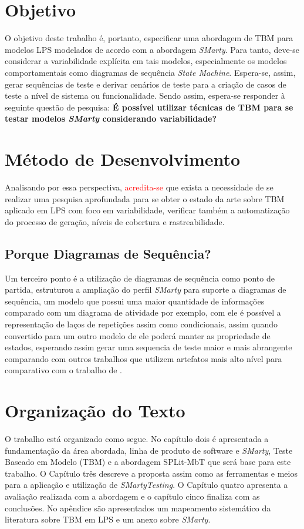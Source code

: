 \section{Objetivo}
O objetivo deste trabalho é, portanto, especificar uma abordagem de TBM para modelos LPS modelados de acordo com a abordagem \textit{SMarty}. Para tanto, deve-se considerar a variabilidade explícita em tais modelos, especialmente os modelos comportamentais como diagramas de sequência \textit{State Machine}. Espera-se, assim, gerar sequências de teste e derivar cenários de teste para a criação de casos de teste a nível de sistema ou funcionalidade. Sendo assim, espera-se responder à seguinte questão de pesquisa: \textbf{É possível utilizar técnicas de TBM para se testar modelos \textit{SMarty} considerando variabilidade?}

\section{Método de Desenvolvimento}
Analisando por essa perspectiva, \textcolor{red}{acredita-se} que exista a necessidade de se realizar uma pesquisa aprofundada para se obter o estado da arte sobre TBM aplicado em LPS com foco em variabilidade, verificar também a automatização do processo de geração, níveis de cobertura e rastreabilidade.

\subsection{Porque Diagramas de Sequência?}
\label{sec:porque_sequencia}
Um terceiro ponto é a utilização de diagramas de sequência como ponto de partida, \citealp{MarcolinoICEIS2014} estruturou a ampliação do perfil \textit{SMarty} para suporte a diagramas de sequência, um modelo que possui uma maior quantidade de informações comparado com um diagrama de atividade por exemplo, com ele é possível a representação de laços de repetições assim como condicionais, assim quando convertido para um outro modelo de ele poderá manter as propriedade de estados, esperando assim gerar uma sequencia de teste maior e mais abrangente comparando com outros trabalhos que utilizem artefatos mais alto nível para comparativo com o trabalho de \citealp{costa2016split}.

\section{Organização do Texto}
O trabalho está organizado como segue. No capítulo dois é apresentada a fundamentação da área abordada, linha de produto de software e \textit{SMarty}, Teste Baseado em Modelo (TBM) e a abordagem SPLit-MbT que será base para este trabalho. O Capítulo três descreve a proposta assim como as ferramentas e meios para a aplicação e utilização de \textit{SMartyTesting}. O Capítulo quatro apresenta a avaliação realizada com a abordagem e o capítulo cinco finaliza com as conclusões. No apêndice são apresentados um mapeamento sistemático da literatura sobre TBM em LPS e um anexo sobre \textit{SMarty}.